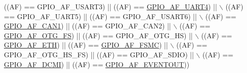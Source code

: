 \begin{DoxyCode}
                          ((AF) == GPIO\_AF\_USART3)    || ((AF) == \hyperlink{group___g_p_i_o___alternat__function__selection__define_gad1754187e64b66681cc1447695062706}{GPIO\_AF\_UART4})  || \(\backslash\)
                          ((AF) == GPIO\_AF\_UART5)     || ((AF) == GPIO\_AF\_USART6) || \(\backslash\)
                          ((AF) == \hyperlink{group___g_p_i_o___alternat__function__selection__define_gaf5defeedc302bf348e31dd7bdcdd882f}{GPIO\_AF\_CAN1})      || ((AF) == GPIO\_AF\_CAN2)   || \(\backslash\)
                          ((AF) == \hyperlink{group___g_p_i_o___alternat__function__selection__define_gaeba0aeefec841e505170efc7762ae588}{GPIO\_AF\_OTG\_FS})    || ((AF) == GPIO\_AF\_OTG\_HS) || \(\backslash\)
                          ((AF) == \hyperlink{group___g_p_i_o___alternat__function__selection__define_ga26cf3f30fe5154bd461b27fab58e45e2}{GPIO\_AF\_ETH})       || ((AF) == 
      \hyperlink{group___g_p_i_o___alternat__function__selection__define_ga8378a89ae1a16d5ae5d315ca49a57674}{GPIO\_AF\_FSMC})   || \(\backslash\)
                          ((AF) == GPIO\_AF\_OTG\_HS\_FS) || ((AF) == GPIO\_AF\_SDIO)   || \(\backslash\)
                          ((AF) == \hyperlink{group___g_p_i_o___alternat__function__selection__define_gaa7bfafac663bac5d437bd6d6a2f6774d}{GPIO\_AF\_DCMI})      || ((AF) == 
      \hyperlink{group___g_p_i_o___alternat__function__selection__define_gacd5e7846b3709cddbf41ece2b1fb068e}{GPIO\_AF\_EVENTOUT}))
\end{DoxyCode}
